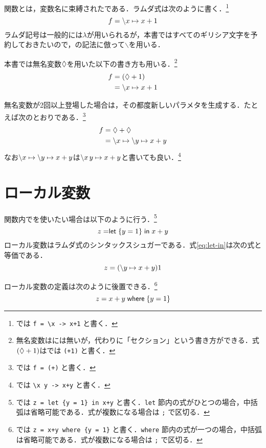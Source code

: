 \documentclass[platex,a5paper,twoside,fleqn,draft]{jsbook}
\newcommand{\keyword}[1]{\textgt{\textbf{#1}}}
\begin{document}
関数とは，変数名に束縛された\keyword{ラムダ式}である．ラムダ式は次のように書く．\footnote{\haskell では \verb|f = \x -> x+1| と書く．}
\begin{equation}
f=\backslash x\mapsto x+1
\end{equation}
ラムダ記号は一般的には$\lambda$が用いられるが，本書ではすべてのギリシア文字を予約しておきたいので，\haskell の記法に倣って$\backslash$を用いる．

本書では無名変数$\mathord{\lozenge}$を用いた以下の書き方も用いる．\footnote{無名変数は\haskell には無いが，代わりに「セクション」という書き方ができる．式$(\mathord{\lozenge}+1)$は\haskell では \verb|(+1)| と書く．}
\begin{align}
f&=\left(\mathord{\lozenge}+1\right)\\
&=\backslash x\mapsto x+1
\end{align}

無名変数が2回以上登場した場合は，その都度新しいパラメタを生成する．たとえば次のとおりである．\footnote{\haskell では \verb|f = (+)| と書く．}
\begin{align}
f&=\mathord{\lozenge}+\mathord{\lozenge}\\
&=\backslash x\mapsto\backslash y\mapsto x+y
\end{align}
なお$\backslash x\mapsto\backslash y\mapsto x+y$は$\backslash x\,y\mapsto x+y$と書いても良い．\footnote{\haskell では \verb|\x y -> x+y| と書く．}

\section{ローカル変数}

関数内で\keyword{ローカル変数}を使いたい場合は以下のように行う．\footnote{\haskell では \verb|z = let {y = 1} in x+y| と書く．\verb|let| 節内の式がひとつの場合，中括弧は省略可能である．式が複数になる場合は \verb|;| で区切る．}
\begin{equation}
z=\mathrel{\textsf{let}}\left\{y=1\right\}\mathrel{\textsf{in}}x+y
\label{eq:let-in}
\end{equation}
ローカル変数はラムダ式のシンタックスシュガーである．式\eqref{eq:let-in}は次の式と等価である．
\begin{equation}
z=(\backslash y\mapsto x+y)1
\end{equation}

ローカル変数の定義は次のように後置できる．\footnote{\haskell では \verb|z = x+y where {y = 1}| と書く．\verb|where| 節内の式が一つの場合，中括弧は省略可能である．式が複数になる場合は \verb|;| で区切る．}
\begin{equation}
z=x+y\mathrel{\textsf{where}}\left\{y=1\right\}
\end{equation}
\end{document}
